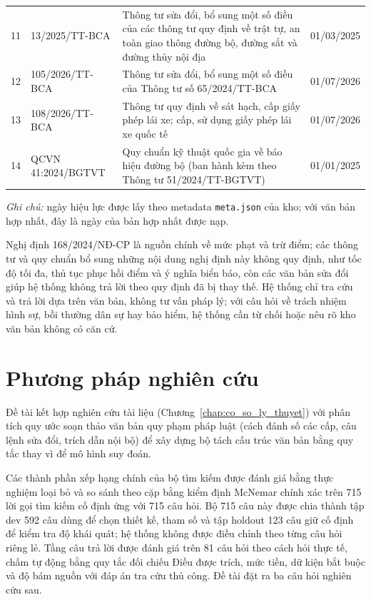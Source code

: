 \begin{table}[H]
\begin{tabularx}{\textwidth}{@{}c l X c@{}}
11 & 13/2025/TT-BCA & Thông tư sửa đổi, bổ sung một số điều của các thông tư quy định về trật tự, an toàn giao thông đường bộ, đường sắt và đường thủy nội địa & 01/03/2025 \\
12 & 105/2026/TT-BCA & Thông tư sửa đổi, bổ sung một số điều của Thông tư số 65/2024/TT-BCA & 01/07/2026 \\
13 & 108/2026/TT-BCA & Thông tư quy định về sát hạch, cấp giấy phép lái xe; cấp, sử dụng giấy phép lái xe quốc tế & 01/07/2026 \\
14 & QCVN 41:2024/BGTVT & Quy chuẩn kỹ thuật quốc gia về báo hiệu đường bộ (ban hành kèm theo Thông tư 51/2024/TT-BGTVT) & 01/01/2025 \\
\bottomrule
\end{tabularx}
\par\smallskip
\parbox{\textwidth}{\footnotesize\textit{Ghi chú:} ngày hiệu lực được lấy theo metadata \texttt{meta.json} của kho; với văn bản hợp nhất, đây là ngày của bản hợp nhất được nạp.}
\end{table}

Nghị định 168/2024/NĐ-CP là nguồn chính về mức phạt và trừ điểm; các thông tư và quy chuẩn bổ sung những nội dung nghị định này không quy định, như tốc độ tối đa, thủ tục phục hồi điểm và ý nghĩa biển báo, còn các văn bản sửa đổi giúp hệ thống không trả lời theo quy định đã bị thay thế. Hệ thống chỉ tra cứu và trả lời dựa trên văn bản, không tư vấn pháp lý; với câu hỏi về trách nhiệm hình sự, bồi thường dân sự hay bảo hiểm, hệ thống cần từ chối hoặc nêu rõ kho văn bản không có căn cứ.

\section{Phương pháp nghiên cứu}
\label{sec:c1_phuong_phap}

Đề tài kết hợp nghiên cứu tài liệu (Chương~\ref{chap:co_so_ly_thuyet}) với phân tích quy ước soạn thảo văn bản quy phạm pháp luật (cách đánh số các cấp, câu lệnh sửa đổi, trích dẫn nội bộ) để xây dựng bộ tách cấu trúc văn bản bằng quy tắc thay vì để mô hình suy đoán.

Các thành phần xếp hạng chính của bộ tìm kiếm được đánh giá bằng thực nghiệm loại bỏ và so sánh theo cặp bằng kiểm định McNemar chính xác \cite{mcnemar1947} trên 715 lời gọi tìm kiếm cố định ứng với 715 câu hỏi. Bộ 715 câu này được chia thành tập dev 592 câu dùng để chọn thiết kế, tham số và tập holdout 123 câu giữ cố định để kiểm tra độ khái quát; hệ thống không được điều chỉnh theo từng câu hỏi riêng lẻ. Tầng câu trả lời được đánh giá trên 81 câu hỏi theo cách hỏi thực tế, chấm tự động bằng quy tắc đối chiếu Điều được trích, mức tiền, dữ kiện bắt buộc và độ bám nguồn với đáp án tra cứu thủ công. Đề tài đặt ra ba câu hỏi nghiên cứu sau.

